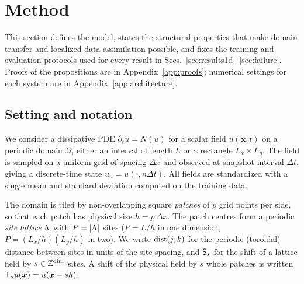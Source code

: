 \section{Method}
\label{sec:method}

This section defines the model, states the structural properties that
make domain transfer and localized data assimilation possible, and fixes
the training and evaluation protocols used for every result in
Secs.~\ref{sec:results1d}--\ref{sec:failure}. Proofs of the
propositions are in Appendix~\ref{app:proofs}; numerical settings for
each system are in Appendix~\ref{app:architecture}.

\subsection{Setting and notation}
\label{sec:notation}

We consider a dissipative PDE $\partial_t u = N(u)$ for a scalar field
$u(\bm{x},t)$ on a periodic domain $\Omega$, either an interval of length
$L$ or a rectangle $L_x\times L_y$. The field is sampled on a uniform grid
of spacing $\Delta x$ and observed at snapshot interval $\Delta t$, giving
a discrete-time state $u_n = u(\cdot, n\Delta t)$. All fields are
standardized with a single mean and standard deviation computed on the
training data.

The domain is tiled by non-overlapping square \emph{patches} of
$p$ grid points per side, so that each patch has physical size
$h = p\,\Delta x$. The patch centres form a periodic \emph{site lattice}
$\Lambda$ with $P = |\Lambda|$ sites ($P = L/h$ in one dimension,
$P = (L_x/h)(L_y/h)$ in two). We write $\operatorname{dist}(j,k)$ for the periodic
(toroidal) distance between sites in units of the site spacing, and
$\mathsf{S}_s$ for the shift of a lattice field by $s\in\mathbb{Z}^{\dim}$ sites. A
shift of the physical field by $s$ whole patches is written
$\mathsf{T}_{s} u(\bm{x}) = u(\bm{x} - s h)$.

